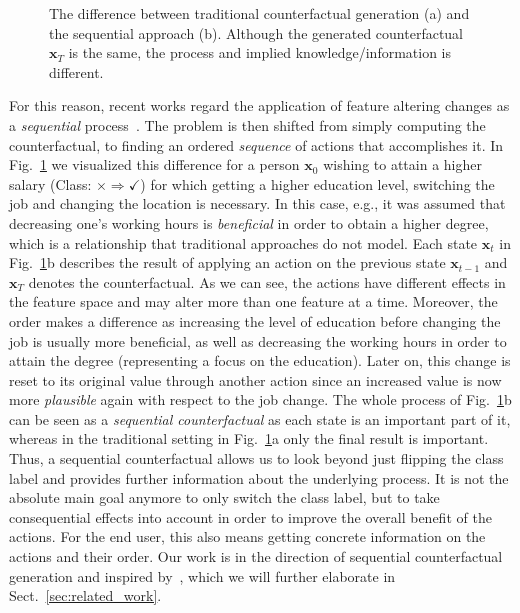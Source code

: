 \documentclass[runningheads, envcountsame, a4paper]{llncs}
\newcommand{\state}{\mathbf{x}}
\newcommand{\initialinstance}{\state_{0}}
\newcommand{\finalsolution}{\state_{T}}
\begin{document}
\begin{figure}[!ht]
	\centering
	\caption{The difference between traditional counterfactual generation (a) and the sequential approach (b). Although the generated counterfactual $\finalsolution$ is the same, the process and implied knowledge/information is different.}
	\label{fig:sequential_vs_traditional}
\end{figure}

For this reason, recent works regard the application of feature altering changes as a \emph{sequential} process~\cite{ramakrishnanSynthesizingActionSequences2020,shavitExtractingIncentivesBlackBox2019}.
The problem is then shifted from simply computing the counterfactual, to finding an ordered \emph{sequence} of actions that accomplishes it. In Fig.~\ref{fig:sequential_vs_traditional} we visualized this difference for a person $\initialinstance$ wishing to attain a higher salary (Class: $\times \Rightarrow \checkmark$) for which getting a higher education level, switching the job and changing the location is necessary. In this case, e.g., it was assumed that decreasing one's working hours is \emph{beneficial} in order to obtain a higher degree, which is a relationship that traditional approaches do not model. Each state $\state_t$ in Fig.~\ref{fig:sequential_vs_traditional}b describes the result of applying an action on the previous state $\state_{t-1}$ and $\finalsolution$ denotes the counterfactual.
As we can see, the actions have different effects in the feature space and may alter more than one feature at a time. Moreover, the order makes a difference as increasing the level of education before changing the job is usually more beneficial, as well as decreasing the working hours in order to attain the degree (representing a focus on the education). Later on, this change is reset to its original value through another action since an increased value is now more \emph{plausible} again with respect to the job change.
The whole process of Fig.~\ref{fig:sequential_vs_traditional}b can be seen as a \emph{sequential counterfactual} as each state is an important part of it, whereas in the traditional setting in Fig.~\ref{fig:sequential_vs_traditional}a only the final result is important. Thus, a sequential counterfactual allows us to look beyond just flipping the class label and provides further information about the underlying process. It is not the absolute main goal anymore to only switch the class label, but to take consequential effects into account in order to improve the overall benefit of the actions. For the end user, this also means getting concrete information on the actions and their order.
Our work is in the direction of sequential counterfactual generation and inspired by~\cite{ramakrishnanSynthesizingActionSequences2020}, which we will further elaborate in Sect.~\ref{sec:related_work}.
\end{document}
